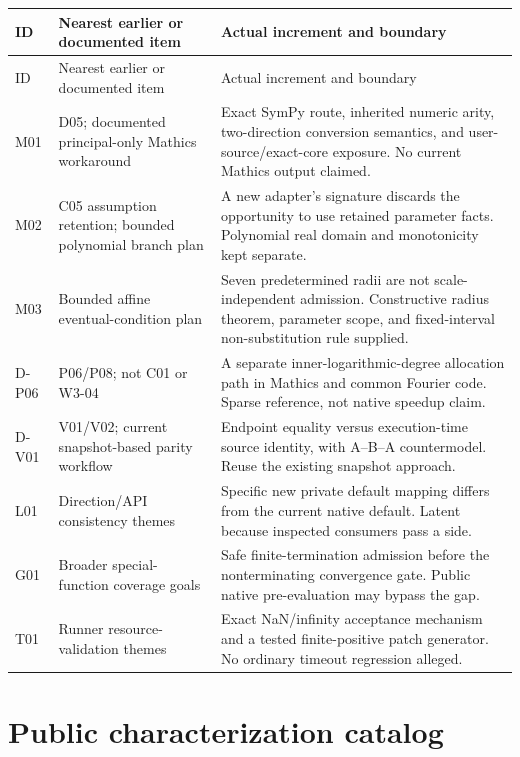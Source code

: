 \documentclass[11pt,a4paper]{article}
\theoremstyle{remark}
\begin{document}
\begin{longtable}{@{}L{17mm}L{42mm}L{87mm}@{}}
\toprule
ID & Nearest earlier or documented item & Actual increment and boundary\\\midrule
\endfirsthead
\toprule ID & Nearest earlier or documented item & Actual increment and boundary\\\midrule
\endhead
M01 & D05; documented principal-only Mathics workaround & Exact SymPy route, inherited numeric arity, two-direction conversion semantics, and user-source/exact-core exposure. No current Mathics output claimed.\\
M02 & C05 assumption retention; bounded polynomial branch plan & A new adapter's signature discards the opportunity to use retained parameter facts. Polynomial real domain and monotonicity kept separate.\\
M03 & Bounded affine eventual-condition plan & Seven predetermined radii are not scale-independent admission. Constructive radius theorem, parameter scope, and fixed-interval non-substitution rule supplied.\\
D-P06 & P06/P08; not C01 or W3-04 & A separate inner-logarithmic-degree allocation path in Mathics and common Fourier code. Sparse reference, not native speedup claim.\\
D-V01 & V01/V02; current snapshot-based parity workflow & Endpoint equality versus execution-time source identity, with A--B--A countermodel. Reuse the existing snapshot approach.\\
L01 & Direction/API consistency themes & Specific new private default mapping differs from the current native default. Latent because inspected consumers pass a side.\\
G01 & Broader special-function coverage goals & Safe finite-termination admission before the nonterminating convergence gate. Public native pre-evaluation may bypass the gap.\\
T01 & Runner resource-validation themes & Exact NaN/infinity acceptance mechanism and a tested finite-positive patch generator. No ordinary timeout regression alleged.\\
\bottomrule
\end{longtable}

\section{Public characterization catalog}
\end{document}
